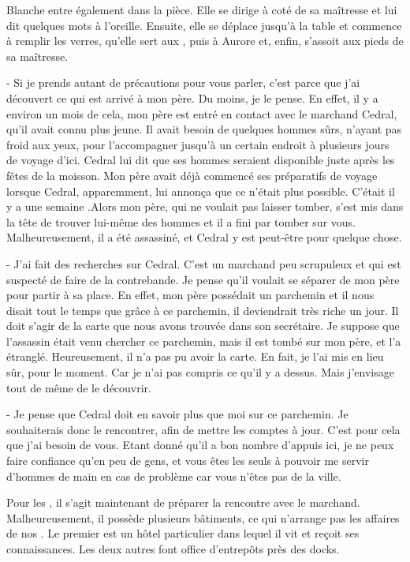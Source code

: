 \documentclass[a4paper,10pt,openany]{book}
\begin{document}
\begin{multicols}{2}
Blanche entre également dans la pièce. Elle se dirige à coté de sa maîtresse et lui dit quelques  mots à l’oreille. Ensuite, elle se déplace jusqu’à
la table et commence à remplir les verres, qu’elle sert aux \PJs, puis à Aurore et, enfin, s’assoit aux pieds de sa maîtresse.
\begin{paperbox}{ }
	- Si je prends autant de précautions pour vous parler, c’est parce que j’ai découvert ce qui est arrivé à mon père. Du moins, je le pense. En effet,
	il y a environ un mois de cela, mon père est entré en contact avec le marchand Cedral, qu’il avait connu plus jeune. Il avait besoin de quelques
	hommes sûrs, n’ayant pas froid aux yeux, pour l’accompagner jusqu’à un certain endroit à plusieurs jours de voyage d’ici. Cedral lui dit que ses
	hommes seraient disponible juste après les fêtes de la moisson. Mon père avait déjà commencé ses préparatifs de voyage lorsque Cedral, apparemment,
	lui annonça que ce n’était plus possible. C’était il y a une semaine .Alors mon père, qui ne voulait pas laisser tomber, s’est mis dans la tête de
	trouver lui-même des hommes et il a fini par tomber sur vous. Malheureusement, il a été assassiné, et Cedral y est peut-être pour quelque
	chose.\par\noindent - J’ai fait des recherches sur Cedral. C’est un marchand peu scrupuleux et qui est suspecté de faire de la contrebande. Je pense
	qu’il voulait se séparer de mon père pour partir à sa place. En effet, mon père possédait un parchemin et il nous disait tout le temps que grâce à ce
	parchemin, il deviendrait très riche un jour. Il doit s’agir de la carte que nous avons trouvée dans son secrétaire. Je suppose que l’assassin était
	venu chercher ce parchemin, mais il est tombé sur mon père, et l’a étranglé. Heureusement, il n’a pas pu avoir la carte. En fait, je l’ai mis en lieu
	sûr, pour le moment. Car je n’ai pas compris ce qu’il y a dessus. Mais j’envisage tout de même de le découvrir.\par\noindent - Je pense que Cedral
	doit en savoir plus que moi sur ce parchemin. Je souhaiterais donc le rencontrer, afin de mettre les comptes à jour. C’est pour cela que j’ai besoin
	de vous. Etant donné qu’il a bon nombre d’appuis ici, je ne peux faire confiance qu’en peu de gens, et vous êtes les seuls à pouvoir me servir
	d’hommes de main en cas de problème car vous n’êtes pas de la ville.
\end{paperbox}
Pour les \PJs, il s’agit maintenant de préparer la rencontre avec le marchand. Malheureusement, il possède plusieurs bâtiments, ce qui n’arrange pas
les affaires de nos \PJs. Le premier est un hôtel particulier dans lequel il vit et reçoit ses connaissances. Les deux autres font office d’entrepôts
près des docks.

\end{multicols}
\end{document}
